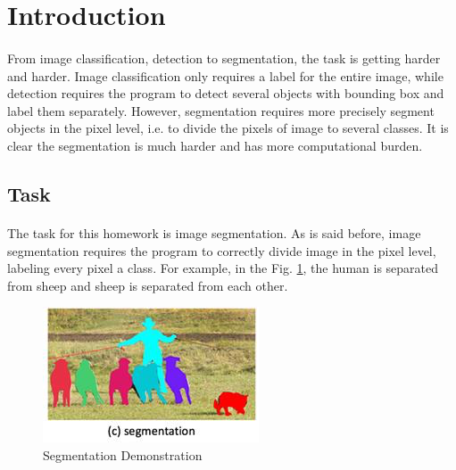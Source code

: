 \documentclass{gapd}
\begin{document}
\maketitle


\section{Introduction}
\label{sec:Introduction}
\paragraph{}
	\lettrine{F}{}rom image classification, detection to segmentation, the task is getting harder and harder. Image classification only requires a label for the entire image, while detection requires the program to detect several objects with bounding box and label them separately. However, segmentation requires more precisely segment objects in the pixel level, i.e. to divide the pixels of image to several classes. It is clear the segmentation is much harder and has more computational burden. 

\subsection{Task}
\paragraph{}
	The task for this homework is image segmentation. As is said before, image segmentation requires the program to correctly divide image in the pixel level, labeling every pixel a class. For example, in the Fig. \ref{fig:segmentation}, the human is separated from sheep and sheep is separated from each other. 

\begin{figure}[t]
	\centering
	\includegraphics[width=\linewidth / 2]{graph/segmentation}
	\caption{Segmentation Demonstration}
	\label{fig:segmentation}
\end{figure}
\end{document}
